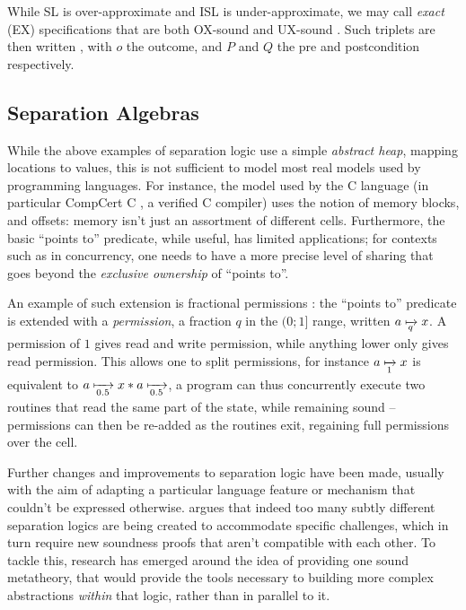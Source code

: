 While SL is over-approximate and ISL is under-approximate, we may call \emph{exact} (EX) specifications that are both OX-sound and UX-sound \cite{exactsl}. Such triplets are then written , with $o$ the outcome, and $P$ and $Q$ the pre and postcondition respectively.

\subsection{Separation Algebras}
\label{sec:separation-algebras}

While the above examples of separation logic use a simple \emph{abstract heap}, mapping locations to values, this is not sufficient to model most real models used by programming languages. For instance, the model used by the C language (in particular CompCert C \cite{compcert}, a verified C compiler) uses the notion of memory blocks, and offsets: memory isn't just an assortment of different cells. Furthermore, the basic ``points to'' predicate, while useful, has limited applications; for contexts such as in concurrency, one needs to have a more precise level of sharing that goes beyond the \emph{exclusive ownership} of ``points to''.

An example of such extension is fractional permissions \cite{fracpermissions, fracpermissions2}: the ``points to'' predicate is extended with a \emph{permission}, a fraction $q$ in the $(0;1]$ range, written $a \mapstoq{q} x$. A permission of $1$ gives read and write permission, while anything lower only gives read permission. This allows one to split permissions, for instance $a \mapstoq{1} x$ is equivalent to $a\mapstoq{0.5}x * a\mapstoq{0.5}$, a program can thus concurrently execute two routines that read the same part of the state, while remaining sound -- permissions can then be re-added as the routines exit, regaining full permissions over the cell.

Further changes and improvements to separation logic have been made, usually with the aim of adapting a particular language feature or mechanism that couldn't be expressed otherwise.  argues that indeed too many subtly different separation logics are being created to accommodate specific challenges, which in turn require new soundness proofs that aren't compatible with each other. To tackle this, research has emerged around the idea of providing one sound metatheory, that would provide the tools necessary to building more complex abstractions \emph{within} that logic, rather than in parallel to it.


